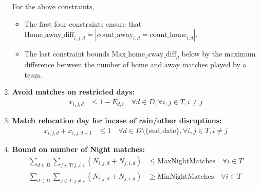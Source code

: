 \documentclass[a4paper, 12pt]{article}
\begin{document}
\begin{enumerate}
    For the above constraints,
    \begin{itemize}
        \item The first four constraints ensure that $\text{Home\_away\_diff}_{i,j,d} = |\text{count\_away}_{i,d} = \text{count\_home}_{i,d}|$.
        \item The last constraint bounds $\text{Max\_home\_away\_diff}_{d}$ below by the maximum difference between the number of home and away matches played by a team.
    \end{itemize}
    \item \textbf{Avoid matches on restricted days:}
    \begin{align*}
        x_{i,j,d} &\leq 1 - E_{d,i} \quad \forall d \in D, \forall i,j \in T, i \neq j
    \end{align*}

    \item \textbf{Match relocation day for incase of rain/other disruptions:}
    \begin{align*}
        x_{i,j,d} + x_{i,j,d+1} &\leq 1 \quad \forall d \in D \setminus \{ \text{end\_date} \}, \forall i,j \in T, i \neq j
    \end{align*}

    \item \textbf{Bound on number of Night matches:}
    \begin{align*}
        \sum_{d \in D} \sum_{j \in T : j \neq i} (N_{i,j,d} + N_{j,i,d}) &\leq \text{MaxNightMatches} \quad \forall i \in T\\
        \sum_{d \in D} \sum_{j \in T : j \neq i} (N_{i,j,d} + N_{j,i,d}) &\geq \text{MinNightMatches} \quad \forall i \in T
    \end{align*}


\end{enumerate}
\end{document}
